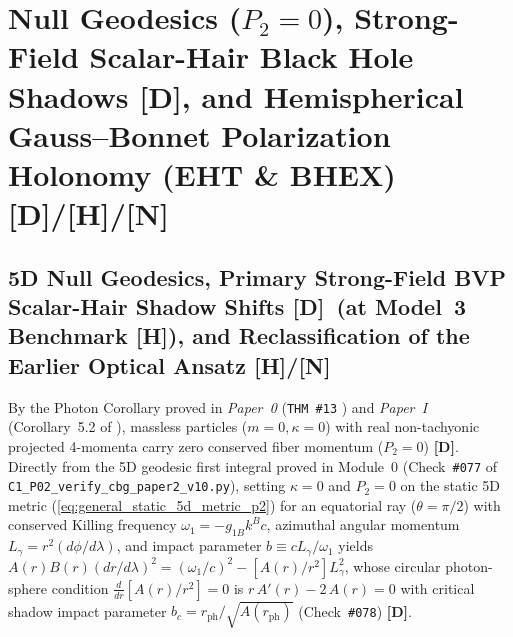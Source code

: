 \documentclass[11pt,a4paper]{article}
\newcommand{\catD}{\textbf{\textcolor{blue!75!black}{[D]}}}
\newcommand{\catH}{\textbf{\textcolor{orange!85!black}{[H]}}}
\newcommand{\catN}{\textbf{\textcolor{teal!75!black}{[N]}}}
\theoremstyle{plain}
\theoremstyle{definition}
\theoremstyle{remark}
\numberwithin{equation}{section}
\begin{document}
\section{\texorpdfstring{Null Geodesics ($P_2 = 0$), Strong-Field Scalar-Hair Black Hole Shadows \catD, and Hemispherical Gauss--Bonnet Polarization Holonomy (EHT \& BHEX) \catD/\catH/\catN}{Null Geodesics, Strong-Field Scalar-Hair Black Hole Shadows, and Hemispherical Gauss-Bonnet Polarization Holonomy}}

\subsection{\texorpdfstring{5D Null Geodesics, Primary Strong-Field BVP Scalar-Hair Shadow Shifts \catD\ (at Model~3 Benchmark \catH), and Reclassification of the Earlier Optical Ansatz \catH/\catN}{5D Null Geodesics, Primary Strong-Field BVP Scalar-Hair Shadow Shifts, and Reclassification of the Earlier Optical Ansatz}}

By the Photon Corollary proved in \textit{Paper~0} (\texttt{THM~\#13} \cite{jimenez2026_p0}) and \textit{Paper~I} (Corollary~5.2 of \cite{jimenez2026a}), massless particles ($m = 0, \kappa = 0$) with real non-tachyonic projected 4-momenta carry zero conserved fiber momentum ($P_2 = 0$) \catD. Directly from the 5D geodesic first integral proved in Module~0 (Check~\texttt{\#077} of \allowbreak\texttt{C1\_P02\_verify\_cbg\_paper2\_v10.py}), setting $\kappa = 0$ and $P_2 = 0$ on the static 5D metric (\ref{eq:general_static_5d_metric_p2}) for an equatorial ray ($\theta = \pi/2$) with conserved Killing frequency $\omega_1 = -g_{1B}k^B c$, azimuthal angular momentum $L_{\gamma} = r^2(d\phi/d\lambda)$, and impact parameter $b \equiv c L_{\gamma}/\omega_1$ yields $A(r)B(r)(dr/d\lambda)^2 = (\omega_1/c)^2 - [A(r)/r^2]L_{\gamma}^2$, whose circular photon-sphere condition $\frac{d}{dr}[A(r)/r^2] = 0$ is $r\,A'(r) - 2\,A(r) = 0$ with critical shadow impact parameter $b_c = r_{\text{ph}}/\sqrt{A(r_{\text{ph}})}$ (Check~\texttt{\#078}) \catD.
\end{document}
